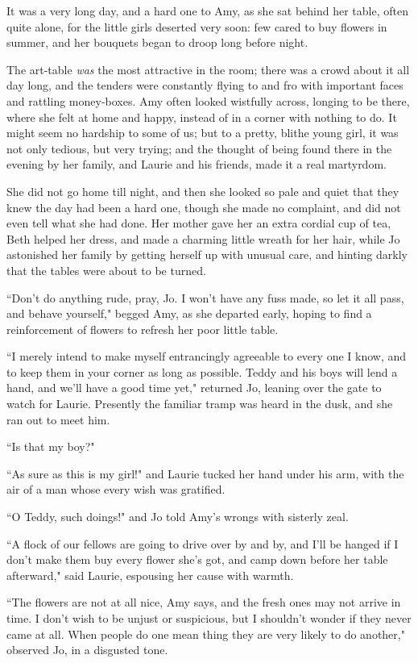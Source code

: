 It was a very long day, and a hard one to Amy, as she sat behind her
table, often quite alone, for the little girls deserted very soon: few
cared to buy flowers in summer, and her bouquets began to droop long
before night.

The art-table \emph{was} the most attractive in the room; there was a
crowd about it all day long, and the tenders were constantly flying to
and fro with important faces and rattling money-boxes. Amy often looked
wistfully across, longing to be there, where she felt at home and happy,
instead of in a corner with nothing to do. It might seem no hardship to
some of us; but to a pretty, blithe young girl, it was not only tedious,
but very trying; and the thought of being found there in the evening by
her family, and Laurie and his friends, made it a real martyrdom.

She did not go home till night, and then she looked so pale and quiet
that they knew the day had been a hard one, though she made no
complaint, and did not even tell what she had done. Her mother gave her
an extra cordial cup of tea, Beth helped her dress, and made a charming
little wreath for her hair, while Jo astonished her family by getting
herself up with unusual care, and hinting darkly that the tables were
about to be turned.

``Don't do anything rude, pray, Jo. I
won't have any fuss made, so let it all pass, and behave
yourself," begged Amy, as she departed early, hoping to find a
reinforcement of flowers to refresh her poor little table.

``I merely intend to make myself entrancingly agreeable to every one I
know, and to keep them in your corner as long as possible. Teddy and his
boys will lend a hand, and we'll have a good time yet,"
returned Jo, leaning over the gate to watch for Laurie. Presently the
familiar tramp was heard in the dusk, and she ran out to meet him.

``Is that my boy?"

``As sure as this is my girl!" and Laurie tucked her hand under his arm,
with the air of a man whose every wish was gratified.

``O Teddy, such doings!" and Jo told Amy's wrongs with
sisterly zeal.

``A flock of our fellows are going to drive over by and by, and
I'll be hanged if I don't make them buy
every flower she's got, and camp down before her table
afterward," said Laurie, espousing her cause with warmth.

``The flowers are not at all nice, Amy says, and the fresh ones may not
arrive in time. I don't wish to be unjust or suspicious,
but I shouldn't wonder if they never came at all. When
people do one mean thing they are very likely to do another," observed
Jo, in a disgusted tone.

